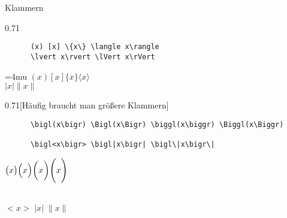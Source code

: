 \begin{frame}[fragile]{Klammern}
  \vspace{-1.5em}
  \begin{CodeExample}{0.71}
    \begin{verbatim}
      (x) [x] \{x\} \langle x\rangle
      \lvert x\rvert \lVert x\rVert
    \end{verbatim}
  \CodeResult
    \strut
    \Umathcloseopenspacing\textstyle=4mu
    $(x) [x] \{x\} \langle x\rangle $\\
    $\lvert x\rvert \lVert x\rVert$
  \end{CodeExample}

  \begin{CodeExample}{0.71}[Häufig braucht man größere Klammern]
    \begin{verbatim}
      \bigl(x\bigr) \Bigl(x\Bigr) \biggl(x\biggr) \Biggl(x\Biggr)

      \bigl<x\bigr> \bigl|x\bigr| \bigl\|x\bigr\|
    \end{verbatim}
  \CodeResult
    \begin{minipage}[c][2\baselineskip][c]{\textwidth}
      $\bigl(x\bigr) \Bigl(x\Bigr) \biggl(x\biggr) \Biggl(x\Biggr)$
    \end{minipage} \\[\baselineskip]\nointerlineskip
    $\bigl< x\bigr> \; \bigl|x\bigr| \; \bigl\|x\bigr\|$
  \end{CodeExample}
\end{frame}


